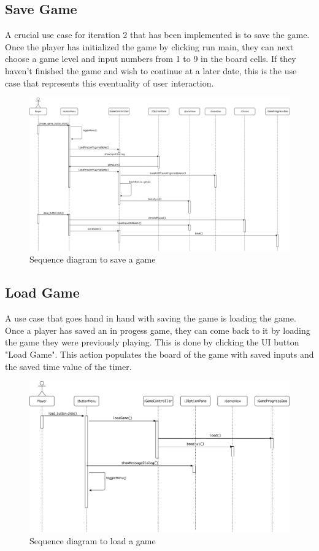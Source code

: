 \documentclass[12pt]{article}
\begin{document}
\subsection{Save Game}
A crucial use case for iteration 2 that has been implemented is to save the game. Once the player has initialized the game by clicking run main, they can next choose a game level and input numbers from 1 to 9 in the board cells. If they haven't finished the game and wish to continue at a later date, this is the use case that represents this eventuality of user interaction.
\begin{figure}[htbp]
    \includegraphics[width=1\textwidth]{saveGame}
    \caption{Sequence diagram to save a game}
    \label{fig:sequenceDiagram}
\end{figure}

\newpage

\subsection{Load Game}
A use case that goes hand in hand with saving the game is loading the game. Once a player has saved an in progess game, they can come back to it by loading the game they were previously playing. This is done by clicking the UI button "Load Game". This action populates the board of the game with saved inputs and the saved time value of the timer.
\begin{figure}[htbp]
    \includegraphics[width=1\textwidth]{loadGame}
    \caption{Sequence diagram to load a game}
    \label{fig:sequenceDiagram}
\end{figure}
\end{document}
